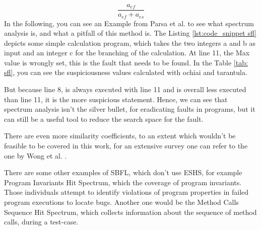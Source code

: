 \begin{equation}
    \frac{a_{ef}}{a_{ef}+a_{es}}
    \label{eq: simple_tarantula}
\end{equation}
In the following, you can see an Example from Parsa et al. \cite{parsa_software_2023} to see what spectrum analysis is, and what a pitfall of this method is.
The Listing \ref{lst:code_snippet sfl} depicts some simple calculation program, which takes the two integers a and b as input and an integer c for the branching of the calculation.
At line 11, the Max value is wrongly set, this is the fault that needs to be found.
In the Table \ref{tab: sfl}, you can see the suspiciousness values calculated with ochiai and tarantula.

But because line 8, is always executed with line 11 and is overall less executed than line 11, it is the more suspicious statement.
Hence, we can see that spectrum analysis isn't the silver bullet, for eradicating faults in programs, but it can still be a useful tool to reduce the search space for the fault.


There are even more similarity coefficients, to an extent which wouldn't be feasible to be covered in this work, for an extensive survey one can refer to the one by Wong et al. \cite{wong_survey_2016}.

There are some other examples of SBFL, which don't use ESHS, for example Program Invariants Hit Spectrum, which the coverage of program invariants.
Those individuals attempt to identify violations of program properties in failed program executions to locate bugs.
Another one would be the Method Calls Sequence Hit Spectrum, which collects information about the sequence of method calls, during a test-case.